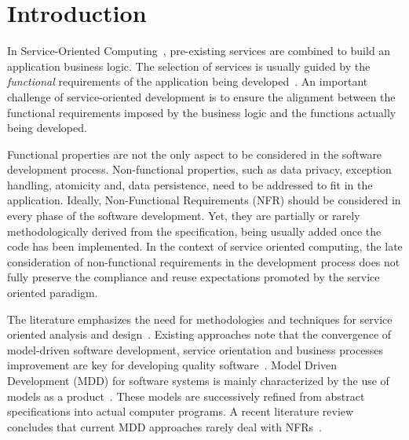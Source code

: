 \documentclass{singlecol-new}
\theoremstyle{TH}{
\newtheorem{lemma}{Lemma}
\newtheorem{theorem}[lemma]{Theorem}
\newtheorem{corrolary}[lemma]{Corrolary}
\newtheorem{conjecture}[lemma]{Conjecture}
\newtheorem{proposition}[lemma]{Proposition}
\newtheorem{claim}[lemma]{Claim}
\newtheorem{stheorem}[lemma]{Wrong Theorem}
\newtheorem{algorithm}{Algorithm}
}
\theoremstyle{THrm}{
\newtheorem{definition}{Definition}[section]
\newtheorem{question}{Question}[section]
\newtheorem{remark}{Remark}
\newtheorem{scheme}{Scheme}
}
\theoremstyle{THhit}{
\newtheorem{case}{Case}[section]
}
\theoremstyle{THhsl}{
\newtheorem{example}{Example}
}
\begin{document}
\section{Introduction}
\label{sec:intro}

In Service-Oriented Computing~\cite{Papazoglou2007}, pre-ex\-isting services are
combined to build an application business logic.
The selection of services is usually guided by the \textit{functional}\footnotemark {} requirements of the application being developed~\cite{2,decastro1,PapazoglouH06}.
An important challenge of service-o\-rien\-ted development is  to ensure the alignment between the functional requirements imposed by the business logic and the functions actually being developed.

Functional properties are not the only aspect to be considered in the software development process.
Non-functional properties, such as data privacy, exception handling, atomicity  and, data persistence, need to be addressed to fit in the application.
Ideally, Non-Functional Requirements (NFR) should be considered in every phase of the software development.
Yet, they are partially or rarely methodologically derived from the specification, being usually added once the code has been im\-ple\-men\-ted.
In the context of service oriented computing, the late consideration of non-functional requirements in the development process does not fully preserve the compliance and re\-use expectations promoted by the service oriented paradigm.

The literature emphasizes the need for meth\-od\-ol\-o\-gies and techniques for service oriented analysis and design~\cite{Papazoglou2007}.
Existing approaches note that the convergence of model-driven soft\-ware development, service orientation  and  busi\-ness processes improvement are key for developing quality software~\cite{watson}.
Model Driven Development (MDD)  for software systems is mainly characterized by the use of models as a product~\cite{Selic03}.
These models are successively refined from abstract specifications into actual computer programs. 
A recent literature review  concludes that current MDD approaches rarely deal with NFRs~\cite{Ameller201542}\footnotemark {}.
\end{document}
